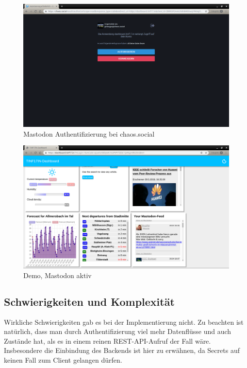 \documentclass[fleqn,10pt]{SelfArx} %
\begin{document}
\begin{figure}
\includegraphics[width=\linewidth]{images/2.png}
\caption{Mastodon Authentifizierung bei chaos.social}
\label{fig:demo2}
\end{figure}

\begin{figure}
	\includegraphics[width=\linewidth]{images/3.png}
	\caption{Demo, Mastodon aktiv}
	\label{fig:demo3}
\end{figure}
\subsection{Schwierigkeiten und Komplexität}
Wirkliche Schwierigkeiten gab es bei der Implementierung nicht. Zu beachten ist natürlich, dass man durch Authentifizierung viel mehr Datenflüsse und auch Zustände hat, als es in einem reinen REST-API-Aufruf der Fall wäre. Insbesondere die Einbindung des Backends ist hier zu erwähnen, da Secrets auf keinen Fall zum Client gelangen dürfen.



\printbibliography%
\end{document}
